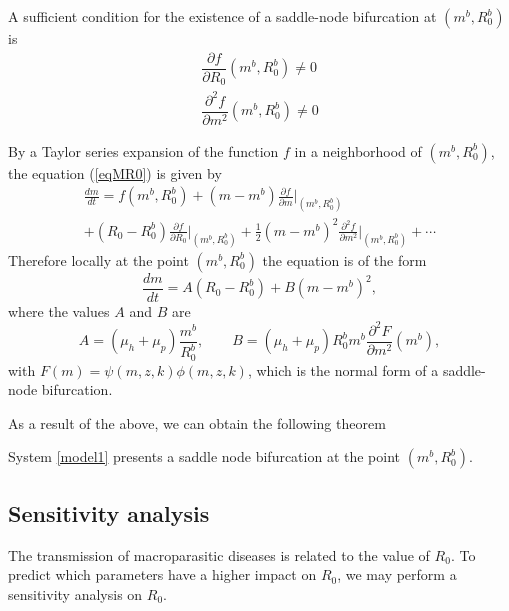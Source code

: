 \documentclass[eng]{MMSB-class-eng}
\begin{document}
{{A sufficient condition for the existence of a saddle-node bifurcation at $(m^b,R_0^b)$ is
\begin{equation}
\begin{split}
\dfrac{\partial f }{\partial R_0}(m^b,R_0^b)\neq0\\
\dfrac{\partial^2 f }{\partial m^2}(m^b,R_0^b)\neq0
\end{split}
\end{equation}

By a Taylor series expansion of the function $f$ in a neighborhood of $(m^b,R_0^b)$, the equation (\ref{eqMR0}) is given by
\begin{multline}
	\frac{dm}{dt}=f(m^b,R_0^b)+(m-m^b)\frac{\partial f }{\partial m}\big\vert_{(m^b,R_0^b)}\\ 
	+(R_0-R_0^b){\frac{\partial f }{\partial R_0}\big\vert_{(m^b,R_0^b)}}%
+{\frac {1}{2}}(m-m^b)^2{\frac{\partial^2 f }{\partial m^2}}\big\vert_{(m^b,R_0^b)}%
	+\cdots 
\end{multline}
Therefore locally at the point $(m^b,R_0^b)$ the equation is of the form
\begin{equation}
\dfrac{dm}{dt}=A(R_0- R_0^b)+B(m- m^b)^2,
\end{equation}
where the values $A$ and $B$ are
\begin{equation}
A=(\mu_h +\mu_p)\frac{ m^b}{ R_0^b}, \qquad  B=(\mu_h + \mu_p) R_0^b  m^b \frac{\partial^2 F}{\partial m^2}( m^b),
\end{equation}
with $F(m)= \psi(m,z,k)\phi(m,z, k)$,
which is the normal form of a saddle-node bifurcation.

{\color{blue}
As a result of the above, we can obtain the following theorem
\begin{theorem}
	System \eqref{model1} presents a saddle node bifurcation at the point $(m^b,R_0^b)$.
\end{theorem}
}

}


\subsection{Sensitivity analysis}
	
	{\color{red}	
		The transmission of macroparasitic diseases is related to the value of $R_0$. To predict which parameters have a higher impact on $R_0$, we may perform a sensitivity analysis on $R_0$.	
	
}}
\end{document}
